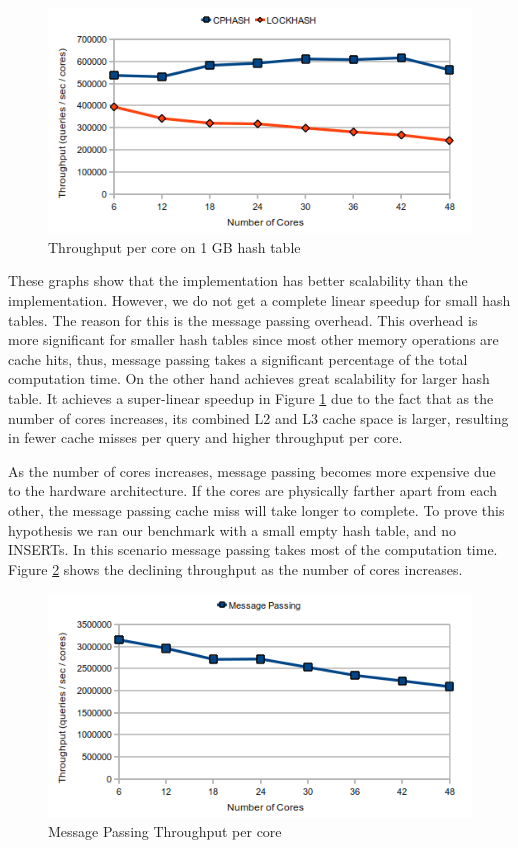 \begin{figure}[!ht]
  \centering
  \includegraphics[width=0.8\linewidth]{figs/scale1gb.png}
  \caption{Throughput per core on 1 GB hash table}
  \label{fig:scale1gb}
\end{figure}

These graphs show that the \cphash{} implementation has better scalability than the \lockhash{} implementation. However, we do not 
get a complete linear speedup for small hash tables. The reason for this is the message passing overhead. This overhead is more significant for smaller 
hash tables since most other memory operations are cache hits, thus, message passing takes a significant percentage of the total computation time. On
the other hand \cphash{} achieves great scalability for larger hash table. It achieves a super-linear speedup in Figure \ref{fig:scale1gb} due to the fact that
as the number of cores increases, its combined L2 and L3 cache space is larger, resulting in fewer cache misses per query and higher throughput per core. 

As the number of cores increases, message passing becomes more expensive due to the hardware architecture. If the cores are physically farther apart from each 
other, the message passing cache miss will take longer to complete. To prove this hypothesis we ran our benchmark with a small empty hash table, and no INSERTs. 
In this scenario message passing takes most of the computation time. Figure \ref{fig:scalemp} shows the declining throughput as the number of cores increases.

\begin{figure}[!ht]
  \centering
  \includegraphics[width=0.8\linewidth]{figs/scalemp.png}
  \caption{Message Passing Throughput per core}
  \label{fig:scalemp}
\end{figure}

